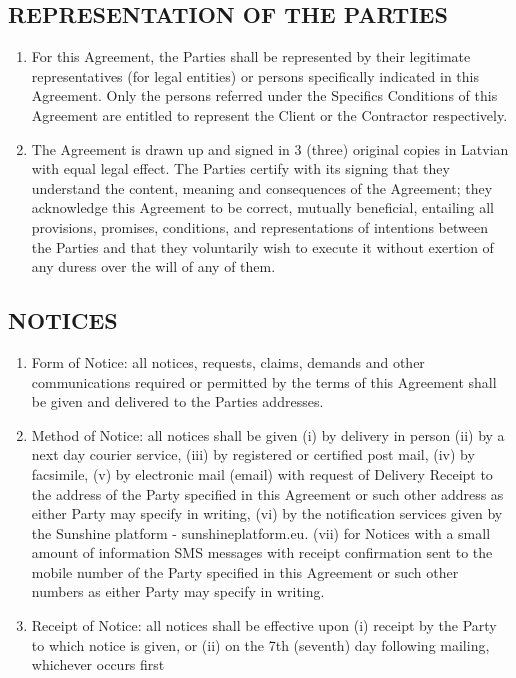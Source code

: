 \begin{multicols}{2}
\subsection{REPRESENTATION OF THE PARTIES}
\begin{enumerate}
	\item	For this Agreement, the Parties shall be represented by their legitimate representatives (for legal entities) or persons specifically indicated in this Agreement. Only the persons referred under the Specifics Conditions of this Agreement are entitled to represent the Client or the Contractor respectively.
	\item	The Agreement is drawn up and signed in 3 (three) original copies in Latvian with equal legal effect. The Parties certify with its signing that they understand the content, meaning and consequences of the Agreement; they acknowledge this Agreement to be correct, mutually beneficial, entailing all provisions, promises, conditions, and representations of intentions between the Parties and that they voluntarily wish to execute it without exertion of any duress over the will of any of them.
\end{enumerate}

\subsection{NOTICES}
\begin{enumerate}
	\item	Form of Notice: all notices, requests, claims, demands and other communications required or permitted by the terms of this Agreement shall be given and delivered to the Parties addresses.
	\item	Method of Notice: all notices shall be given (i) by delivery in person (ii) by a next day courier service, (iii) by registered or certified post mail, (iv) by facsimile, (v) by electronic mail (email) with request of Delivery Receipt to the address of the Party specified in this Agreement or such other address as either Party may specify in writing, (vi) by the notification services given by the Sunshine platform - sunshineplatform.eu. (vii) for Notices with a small amount of information SMS messages with receipt confirmation sent to the mobile number of the Party specified in this Agreement or such other numbers as either Party may specify in writing.
	\item	Receipt of Notice: all notices shall be effective upon (i) receipt by the Party to which notice is given, or (ii) on the 7th (seventh) day following mailing, whichever occurs first
\end{enumerate}

\end{multicols}
